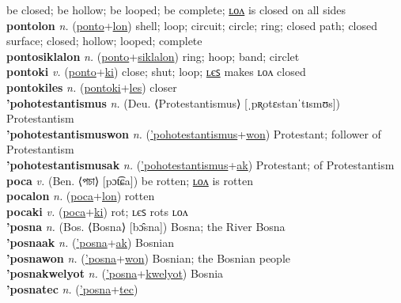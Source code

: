 be closed; be hollow; be looped; be complete; \hyperref[pontolon]{ʟᴏᴧ} is closed on all sides \label{ponto} \\
\textbf{pontolon} \textit{n.} (\hyperref[ponto]{ponto}+\hyperref[lon]{lon})
shell; loop; circuit; circle; ring; closed path; closed surface; closed; hollow; looped; complete \label{pontolon} \\
\textbf{pontosiklalon} \textit{n.} (\hyperref[ponto]{ponto}+\hyperref[siklalon]{siklalon})
ring; hoop; band; circlet \label{pontosiklalon} \\
\textbf{pontoki} \textit{v.} (\hyperref[ponto]{ponto}+\hyperref[ki]{ki})
close; shut; loop; \hyperref[pontokiles]{ʟєꜱ} makes ʟᴏᴧ closed \label{pontoki} \\
\textbf{pontokiles} \textit{n.} (\hyperref[pontoki]{pontoki}+\hyperref[les]{les})
closer \label{pontokiles} \\
\textbf{'pohotestantismus} \textit{n.} (Deu. ⟨Protestantismus⟩ [ˌpʀ̥otɛstanˈtɪsmʊs])
Protestantism \label{'pohotestantismus} \\
\textbf{'pohotestantismuswon} \textit{n.} (\hyperref['pohotestantismus]{'pohotestantismus}+\hyperref[won]{won})
Protestant; follower of Protestantism \label{'pohotestantismuswon} \\
\textbf{'pohotestantismusak} \textit{n.} (\hyperref['pohotestantismus]{'pohotestantismus}+\hyperref[ak]{ak})
Protestant; of Protestantism \label{'pohotestantismusak} \\
\textbf{poca} \textit{v.} (Ben. ⟨পচা⟩ [pɔt͡ɕa])
be rotten; \hyperref[pocalon]{ʟᴏᴧ} is rotten \label{poca} \\
\textbf{pocalon} \textit{n.} (\hyperref[poca]{poca}+\hyperref[lon]{lon})
rotten \label{pocalon} \\
\textbf{pocaki} \textit{v.} (\hyperref[poca]{poca}+\hyperref[ki]{ki})
rot; ʟєꜱ rots ʟᴏᴧ \label{pocaki} \\
\textbf{'posna} \textit{n.} (Bos. ⟨Bosna⟩ [bɔ̂sna])
Bosna; the River Bosna \label{'posna} \\
\textbf{'posnaak} \textit{n.} (\hyperref['posna]{'posna}+\hyperref[ak]{ak})
Bosnian \label{'posnaak} \\
\textbf{'posnawon} \textit{n.} (\hyperref['posna]{'posna}+\hyperref[won]{won})
Bosnian; the Bosnian people \label{'posnawon} \\
\textbf{'posnakwelyot} \textit{n.} (\hyperref['posna]{'posna}+\hyperref[kwelyot]{kwelyot})
Bosnia \label{'posnakwelyot} \\
\textbf{'posnatec} \textit{n.} (\hyperref['posna]{'posna}+\hyperref[tec]{tec})
